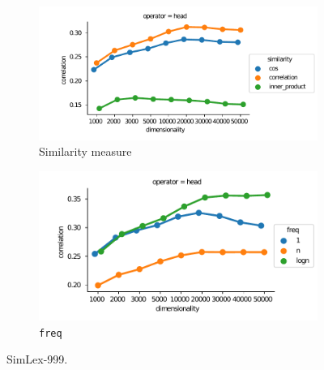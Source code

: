 \begin{figure}[b]
  \centering

  \begin{subfigure}[t]{0.49\textwidth}
    \hspace{-20pt}
  \includegraphics[width=1.1\textwidth]{supplement/figures/SimLex999-interaction-similarity}

  \caption{Similarity measure}
  \label{fig:SimLex999-similarity}

  \end{subfigure}
  \begin{subfigure}[t]{0.49\textwidth}

  \includegraphics[width=\textwidth]{supplement/figures/SimLex999-interaction-freq}

  \caption{\texttt{freq}}
  \label{fig:SimLex999-freq}

  \end{subfigure}

  \caption{SimLex-999.}
\end{figure}
